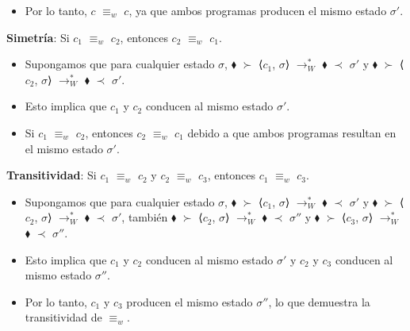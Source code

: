 \documentclass{article}
\begin{document}
\begin{itemize}
\begin{itemize}
\begin{itemize}
\begin{itemize}
                    \item Por lo tanto, $c$ $\equiv_w$ $c$, ya que ambos programas producen el mismo estado $\sigma'$.\\
                \end{itemize}
            \end{itemize}
            
            \textbf{Simetría}:  Si $c_1$ $\equiv_w$ $c_2$, entonces $c_2$ $\equiv_w$ $c_1$.

            \begin{itemize}
                \item Supongamos que para cualquier estado $\sigma$, $\blacklozenge$ $\succ$  ⟨$c_1$, $\sigma$⟩ $\longrightarrow^{*}_{W}$ $\blacklozenge$ $\prec$ $\sigma'$ y $\blacklozenge$ $\succ$ ⟨$c_2$, $\sigma$⟩ $\longrightarrow^{*}_{W}$ $\blacklozenge$ $\prec$ $\sigma'$.

                \item Esto implica que $c_1$ y $c_2$ conducen al mismo estado $\sigma'$.

                \item Si $c_1$ $\equiv_w$ $c_2$, entonces $c_2$ $\equiv_w$ $c_1$ debido a que ambos programas resultan en el mismo estado $\sigma'$.\\
            \end{itemize}
            
            \textbf{Transitividad}: Si $c_1$ $\equiv_w$ $c_2$ y $c_2$ $\equiv_w$ $c_3$, entonces $c_1$ $\equiv_w$ $c_3$.

                \begin{itemize}
                    \item Supongamos que para cualquier estado $\sigma$, $\blacklozenge$ $\succ$  ⟨$c_1$, $\sigma$⟩ $\longrightarrow^{*}_{W}$ $\blacklozenge$ $\prec$ $\sigma'$ y $\blacklozenge$ $\succ$ ⟨$c_2$, $\sigma$⟩ $\longrightarrow^{*}_{W}$ $\blacklozenge$ $\prec$ $\sigma'$, también $\blacklozenge$ $\succ$  ⟨$c_2$, $\sigma$⟩ $\longrightarrow^{*}_{W}$ $\blacklozenge$ $\prec$ $\sigma''$ y $\blacklozenge$ $\succ$ ⟨$c_3$, $\sigma$⟩ $\longrightarrow^{*}_{W}$ $\blacklozenge$ $\prec$ $\sigma''$.

                    \item Esto implica que $c_1$ y $c_2$ conducen al mismo estado $\sigma'$ y $c_2$ y $c_3$ conducen al mismo estado $\sigma''$.

                    \item Por lo tanto, $c_1$ y $c_3$ producen el mismo estado $\sigma''$, lo que demuestra la transitividad de $\equiv_w$.
                \end{itemize}


\end{itemize}
\end{itemize}
\end{document}
